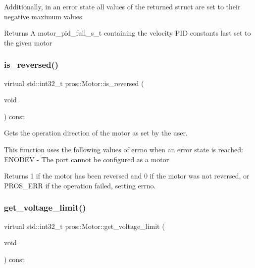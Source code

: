 Additionally, in an error state all values of the returned struct are set to their negative maximum values.

\begin{DoxyReturn}{Returns}
A motor\+\_\+pid\+\_\+full\+\_\+s\+\_\+t containing the velocity P\+ID constants last set to the given motor 
\end{DoxyReturn}
\mbox{\label{classpros_1_1Motor_a5122faa60ef7745761eca847192560c5}} 
\subsubsection{\texorpdfstring{is\+\_\+reversed()}{is\_reversed()}}
{\footnotesize\ttfamily virtual std\+::int32\+\_\+t pros\+::\+Motor\+::is\+\_\+reversed (\begin{DoxyParamCaption}\item[{void}]{ }\end{DoxyParamCaption}) const\hspace{0.3cm}{\ttfamily [virtual]}}



Gets the operation direction of the motor as set by the user. 

This function uses the following values of errno when an error state is reached\+: E\+N\+O\+D\+EV -\/ The port cannot be configured as a motor

\begin{DoxyReturn}{Returns}
1 if the motor has been reversed and 0 if the motor was not reversed, or P\+R\+O\+S\+\_\+\+E\+RR if the operation failed, setting errno. 
\end{DoxyReturn}
\mbox{\label{classpros_1_1Motor_a2afbe15bed764ca6d21f1e7c6c8da700}} 
\subsubsection{\texorpdfstring{get\+\_\+voltage\+\_\+limit()}{get\_voltage\_limit()}}
{\footnotesize\ttfamily virtual std\+::int32\+\_\+t pros\+::\+Motor\+::get\+\_\+voltage\+\_\+limit (\begin{DoxyParamCaption}\item[{void}]{ }\end{DoxyParamCaption}) const\hspace{0.3cm}{\ttfamily [virtual]}}



